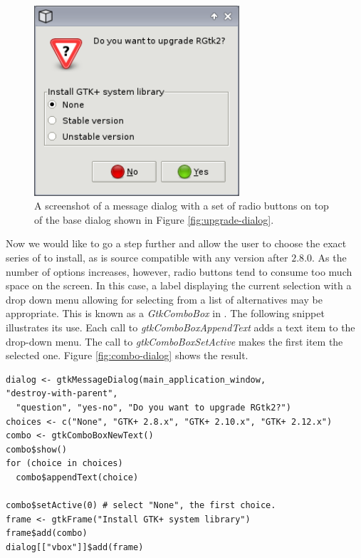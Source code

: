 \documentclass[article]{jss}
\begin{document}
\begin{figure}
\begin{center}
\includegraphics[width=3in]{radio-dialog.png}
\caption{\label{fig:radio-dialog}A screenshot of a message dialog with
a set of
radio buttons on top of the base dialog shown in Figure
\ref{fig:upgrade-dialog}.}
\end{center}
\end{figure}

Now we would like to go a step further and allow the user to choose
the exact series of  to install, as  is source
compatible with any version after $2.8.0$. As the number of options
increases, however, radio buttons tend to consume too much space on
the screen. In
this case, a label displaying the current selection with a drop down
menu allowing for selecting from a list of alternatives may be
appropriate.  This is known as a \emph{GtkComboBox} in . The
following snippet illustrates its use. Each call to
\emph{gtkComboBoxAppendText} adds a text item to the drop-down
menu. The call to \emph{gtkComboBoxSetActive} makes the first item the
selected one. Figure \ref{fig:combo-dialog} shows the result.
\begin{verbatim}
dialog <- gtkMessageDialog(main_application_window,
"destroy-with-parent", 
  "question", "yes-no", "Do you want to upgrade RGtk2?")
choices <- c("None", "GTK+ 2.8.x", "GTK+ 2.10.x", "GTK+ 2.12.x")
combo <- gtkComboBoxNewText()
combo$show()
for (choice in choices) 
  combo$appendText(choice)

combo$setActive(0) # select "None", the first choice.
frame <- gtkFrame("Install GTK+ system library")
frame$add(combo)
dialog[["vbox"]]$add(frame)
\end{verbatim}
\end{document}
